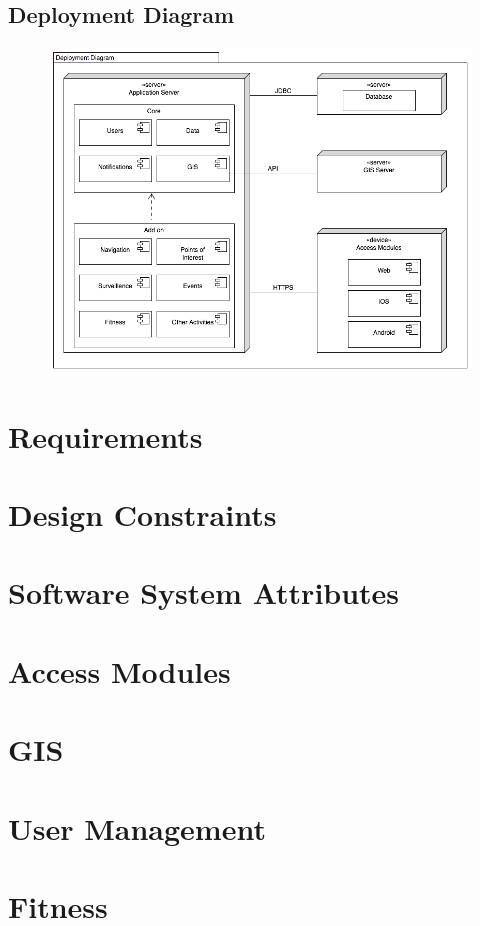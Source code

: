 \documentclass{article}
\begin{document}
	\subsection{Deployment Diagram}
		\begin{figure}[H]
			\includegraphics[width=150mm]{Deployment/Deployment_Diagram.png}
		\end{figure}
\clearpage
\section{Requirements}
	
\clearpage
\section{Design Constraints}
	
\clearpage
\section{Software System Attributes}
	
\clearpage
\section{Access Modules}
	
\clearpage
\section{GIS}
	
\clearpage
\section{User Management}
	
\clearpage
\section{Fitness}
	
\end{document}
